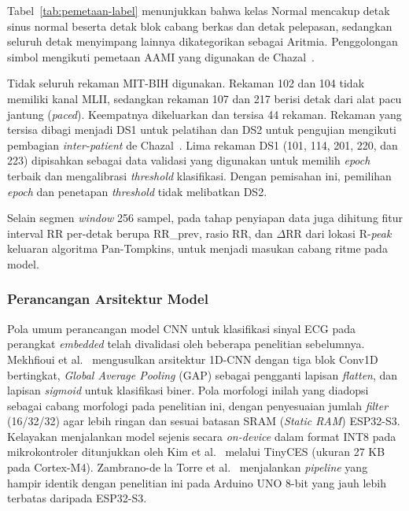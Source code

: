 Tabel~\ref{tab:pemetaan-label} menunjukkan bahwa kelas Normal mencakup detak sinus normal beserta detak blok cabang berkas dan detak pelepasan, sedangkan seluruh detak menyimpang lainnya dikategorikan sebagai Aritmia. Penggolongan simbol mengikuti pemetaan AAMI yang digunakan de Chazal~\cite{aami_ec57_2012, dechazal_2004}.

Tidak seluruh rekaman MIT-BIH digunakan. Rekaman 102 dan 104 tidak memiliki kanal MLII, sedangkan rekaman 107 dan 217 berisi detak dari alat pacu jantung (\textit{paced}). Keempatnya dikeluarkan dan tersisa 44 rekaman. Rekaman yang tersisa dibagi menjadi DS1 untuk pelatihan dan DS2 untuk pengujian mengikuti pembagian \textit{inter-patient} de Chazal~\cite{dechazal_2004}. Lima rekaman DS1 (101, 114, 201, 220, dan 223) dipisahkan sebagai data validasi yang digunakan untuk memilih \textit{epoch} terbaik dan mengalibrasi \textit{threshold} klasifikasi. Dengan pemisahan ini, pemilihan \textit{epoch} dan penetapan \textit{threshold} tidak melibatkan DS2.

Selain segmen \textit{window} 256 sampel, pada tahap penyiapan data juga dihitung fitur interval RR per-detak berupa RR\_prev, rasio RR, dan $\Delta$RR dari lokasi R-\textit{peak} keluaran algoritma Pan-Tompkins, untuk menjadi masukan cabang ritme pada model.

\subsubsection{Perancangan Arsitektur Model}

Pola umum perancangan model CNN untuk klasifikasi sinyal ECG pada perangkat
\textit{embedded} telah divalidasi oleh beberapa penelitian sebelumnya. Mekhfioui et
al.~\cite{mekhfioui_2025} mengusulkan arsitektur 1D-CNN dengan tiga blok Conv1D
bertingkat, \textit{Global Average Pooling} (GAP) sebagai pengganti lapisan \emph{flatten}, dan
lapisan \textit{sigmoid} untuk klasifikasi biner. Pola morfologi inilah yang diadopsi sebagai
cabang morfologi pada penelitian ini, dengan penyesuaian jumlah \emph{filter}
(16/32/32) agar lebih ringan dan sesuai batasan SRAM (\textit{Static RAM}) ESP32-S3. Kelayakan menjalankan
model sejenis secara \emph{on-device} dalam format INT8 pada mikrokontroler ditunjukkan
oleh Kim et al.~\cite{kim_2023} melalui TinyCES (ukuran 27 KB pada Cortex-M4).
Zambrano-de la Torre et al.~\cite{zambrano_2026} menjalankan \textit{pipeline}
yang hampir identik dengan penelitian ini pada Arduino UNO 8-bit
yang jauh lebih terbatas daripada ESP32-S3.

